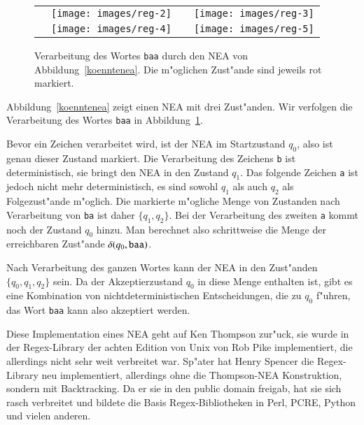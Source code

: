\begin{figure}
\begin{center}
\begin{tabular}{cccc}
&%
\texttt{[image: images/reg-2]}&
\raisebox{60pt}{$\overset{\displaystyle\text{\tt b}}\longrightarrow$}&
\texttt{[image: images/reg-3]}\\
\raisebox{60pt}{$\overset{\displaystyle\text{\tt a}}\longrightarrow$}&
\texttt{[image: images/reg-4]}&
\raisebox{60pt}{$\overset{\displaystyle\text{\tt a}}\longrightarrow$}&
\texttt{[image: images/reg-5]}
\end{tabular}
\end{center}
\caption{Verarbeitung des Wortes {\tt baa} durch den NEA von
Abbildung~\ref{koenntenea}. Die m"oglichen Zust"ande sind jeweils
rot markiert.\label{koenntebeispiel}
}
\end{figure}
Abbildung~\ref{koenntenea} zeigt einen NEA mit drei Zust"anden.
Wir verfolgen die Verarbeitung des Wortes {\tt baa} in
Abbildung~\ref{koenntebeispiel}.

Bevor ein Zeichen verarbeitet wird,
ist der NEA im Startzustand $q_0$, also ist genau dieser Zustand
markiert. Die Verarbeitung des Zeichens {\tt b} ist deterministisch,
sie bringt den NEA in den Zustand $q_1$. Das folgende Zeichen {\tt a}
ist jedoch nicht mehr deterministisch, es sind sowohl $q_1$ als auch
$q_2$ als Folgezust"ande m"oglich. Die markierte m"ogliche Menge
von Zustanden nach Verarbeitung von {\tt ba} ist daher
$\{q_1,q_2\}$. Bei der Verarbeitung des zweiten {\tt a} kommt noch
der Zustand $q_0$ hinzu. Man berechnet also schrittweise die
Menge der erreichbaren Zust"ande $\delta(q_0,{\tt baa})$.

Nach Verarbeitung des ganzen Wortes kann der NEA in den Zust"anden
$\{q_0,q_1,q_2\}$ sein. Da der Akzeptierzustand $q_0$ in diese Menge
enthalten ist, gibt es eine Kombination von nichtdeterministischen
Entscheidungen, die zu $q_0$ f"uhren, das Wort {\tt baa} kann also
akzeptiert werden.

Diese Implementation eines NEA geht auf Ken Thompson zur"uck, sie wurde in
der Regex-Library der achten Edition von Unix von Rob Pike
 implementiert, die allerdings nicht sehr weit
verbreitet war. Sp"ater hat Henry Spencer die Regex-Library neu
implementiert, allerdings ohne die Thompson-NEA Konstruktion, sondern
mit Backtracking. Da er sie in den public domain freigab, hat sie sich
rasch verbreitet und bildete die Basis Regex-Bibliotheken in Perl, PCRE,
Python und vielen anderen.

